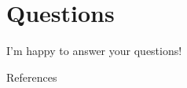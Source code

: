 \documentclass[10pt]{beamer}
\begin{document}
\section{Questions}


\begin{frame}[standout]
  I'm happy to answer your questions!
\end{frame}

\begin{frame}
      \begin{block}{References}
		\begin{footnotesize}
			
            
		\end{footnotesize}
      \end{block}
\end{frame}
\end{document}
